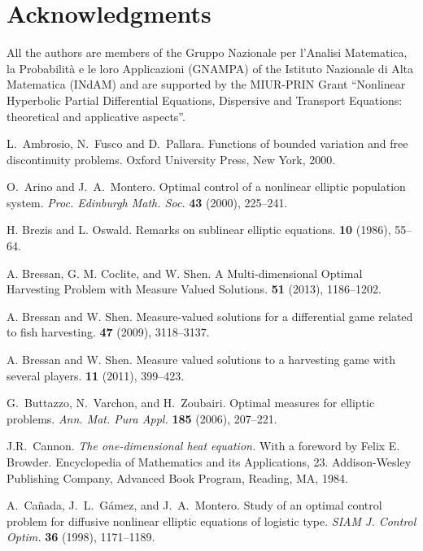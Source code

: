 \documentclass[11pt,leqno]{amsart}
\numberwithin{equation}{section}
\begin{document}
\section*{Acknowledgments}
All the authors are members of the Gruppo Nazionale per l'Analisi Matematica, la Probabilit\`a e le loro Applicazioni (GNAMPA) of the Istituto Nazionale di Alta Matematica (INdAM) and are supported by the MIUR-PRIN Grant ``Nonlinear Hyperbolic Partial Differential Equations, Dispersive and Transport Equations: theoretical and applicative aspects''. 
 \begin{thebibliography}{10}

 L.~Ambrosio, N.~Fusco and D.~Pallara.
\newblock Functions of bounded variation and free discontinuity problems. 
\newblock Oxford University Press, New York, 2000.

 O.~Arino and J.~A.~Montero.
Optimal control of a nonlinear elliptic population system.
{\it Proc. Edinburgh Math. Soc.} {\bf  43} (2000), 225--241.

\newblock  H. Brezis and L. Oswald.  
\newblock  Remarks on sublinear elliptic equations.
 {\bf 10} (1986), 55--64.

\newblock  A. Bressan, G. M. Coclite, and W. Shen.  
\newblock  A Multi-dimensional Optimal Harvesting Problem with Measure Valued Solutions.
 {\bf 51} (2013),  1186--1202.

\newblock  A. Bressan and W. Shen.  
\newblock  Measure-valued solutions for a differential game related to fish harvesting.
 {\bf 47} (2009), 3118--3137.

\newblock  A. Bressan and W. Shen.  
\newblock  Measure valued solutions to a harvesting game
with several players.
 {\bf 11} (2011), 399--423.

G.~Buttazzo, N.~Varchon, and H.~Zoubairi. 
Optimal measures for elliptic problems. 
{\it Ann. Mat. Pura Appl.} {\bf  185} (2006), 207--221.

J.R.~Cannon. {\it The one-dimensional heat equation.}
With a foreword by Felix E. Browder. Encyclopedia of Mathematics and its Applications, 23. Addison-Wesley Publishing Company, Advanced Book Program, Reading, MA, 1984.

A.~Ca\~nada, J.~L.~G\'amez, and J.~A.~Montero.
Study of an optimal control problem for diffusive nonlinear elliptic equations of logistic type.
{\it SIAM J. Control Optim.} {\bf 36} (1998), 1171--1189.


\end{thebibliography}
\end{document}
